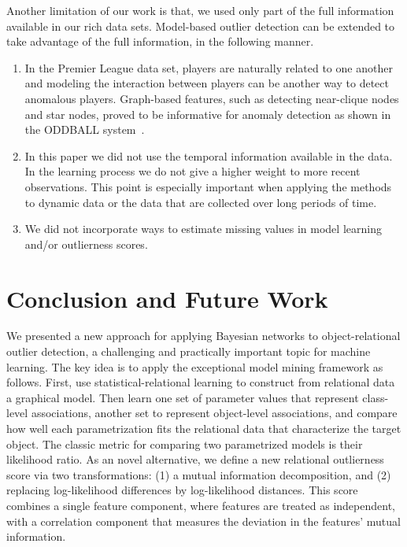 {Another limitation of our work is that, we used only part of the full information available in our rich data sets. Model-based outlier detection can be extended to take advantage of the full information, in the following manner. 
	\begin{enumerate}
		\item In the Premier League data set, players are naturally related to one another and modeling the interaction between players can be another way to detect anomalous players.
		Graph-based features, such as detecting near-clique nodes and star nodes, proved to be informative for anomaly detection as shown in the ODDBALL system~\citep{Akoglu2010}.
		\item In this paper we did not use the temporal information available in the data. In the learning process we do not give a higher weight to more recent observations. This point is especially important when applying the methods to dynamic data or the data that are collected over long periods of time. 
		\item We did not incorporate ways to estimate missing values in model learning and/or outlierness scores. 
	\end{enumerate}
		


\section{Conclusion and Future Work} We presented a new approach for applying Bayesian networks to object-relational outlier detection, a challenging and practically important topic for machine learning. The key idea is to apply the exceptional model mining framework as follows. First, use statistical-relational learning to construct from relational data a graphical model. Then learn one set of parameter values that represent class-level associations, another set to represent object-level associations, and compare how well each parametrization fits the relational data that characterize the target object. The classic metric for comparing two parametrized models is their likelihood ratio. As an novel alternative, we  define  a new relational outlierness score via two transformations:  (1) a mutual information decomposition, and (2) replacing log-likelihood differences by log-likelihood distances. This score combines a single feature component, where features are treated as independent, with a correlation component that measures the deviation in the features' mutual information.

}
